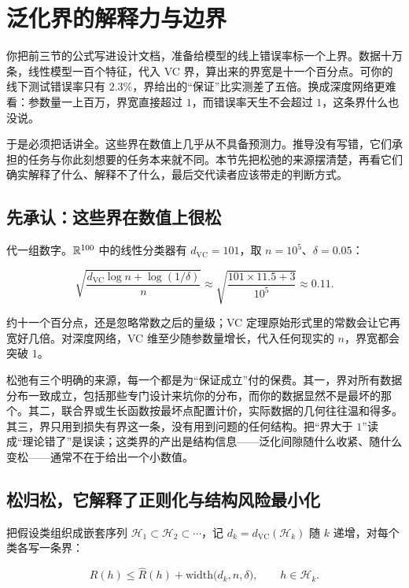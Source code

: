 \section{泛化界的解释力与边界}
\label{sec:13-Machine-Learning/10-Learning-Theory/04}

你把前三节的公式写进设计文档，准备给模型的线上错误率标一个上界。数据十万条，线性模型一百个特征，代入 VC 界，算出来的界宽是十一个百分点。可你的线下测试错误率只有 \(2.3\%\)，界给出的``保证''比实测差了五倍。换成深度网络更难看：参数量一上百万，界宽直接超过 \(1\)，而错误率天生不会超过 \(1\)，这条界什么也没说。

于是必须把话讲全。这些界在数值上几乎从不具备预测力。推导没有写错，它们承担的任务与你此刻想要的任务本来就不同。本节先把松弛的来源摆清楚，再看它们确实解释了什么、解释不了什么，最后交代读者应该带走的判断方式。

\subsection{先承认：这些界在数值上很松}

代一组数字。\(\mathbb{R}^{100}\) 中的线性分类器有 \(d_{\mathrm{VC}}=101\)，取 \(n=10^5\)、\(\delta=0.05\)：

\[
\sqrt{\frac{d_{\mathrm{VC}}\log n+\log(1/\delta)}{n}}
\approx\sqrt{\frac{101\times11.5+3}{10^{5}}}
\approx 0.11.
\]

约十一个百分点，还是忽略常数之后的量级；VC 定理原始形式里的常数会让它再宽好几倍。对深度网络，VC 维至少随参数量增长，代入任何现实的 \(n\)，界宽都会突破 \(1\)。

松弛有三个明确的来源，每一个都是为``保证成立''付的保费。其一，界对所有数据分布一致成立，包括那些专门设计来坑你的分布，而你的数据显然不是最坏的那个。其二，联合界或生长函数按最坏点配置计价，实际数据的几何往往温和得多。其三，界只用到损失有界这一条，没有用到问题的任何结构。把``界大于 \(1\)''读成``理论错了''是误读；这类界的产出是结构信息——泛化间隙随什么收紧、随什么变松——通常不在于给出一个小数值。

\subsection{松归松，它解释了正则化与结构风险最小化}

把假设类组织成嵌套序列 \(\mathcal{H}_1\subset\mathcal{H}_2\subset\cdots\)，记 \(d_k=d_{\mathrm{VC}}(\mathcal{H}_k)\) 随 \(k\) 递增，对每个类各写一条界：

\[
R(h)\le\widehat R(h)+\mathrm{width}\bigl(d_k,n,\delta\bigr),
\qquad h\in\mathcal{H}_k.
\]

